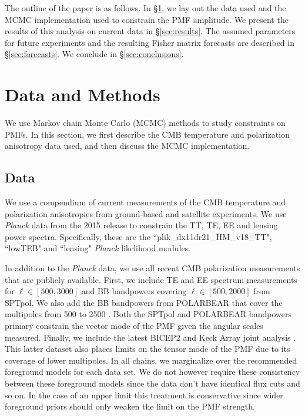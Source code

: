\documentclass[preprint]{emulateapj}
\newcommand{\planck}{{\sl Planck}}
\newcommand{\pb}{POLARBEAR}
\newcommand{\sptpol}{SPTpol}
\begin{document}
The outline of the paper is as follows. 
In \S\ref{sec:data}, we lay out the data used and the MCMC implementation used to constrain the PMF amplitude. 
We present the results of this analysis on current data in \S\ref{sec:results}. 
The assumed parameters for future experiments and the resulting Fisher matrix forecasts are described in \S\ref{sec:forecasts}. 
We conclude in \S\ref{sec:conclusions}. 

\section{Data and Methods}
\label{sec:data}

We use  Markov chain Monte Carlo (MCMC) methods to study constraints on PMFs. 
In this section, we first describe the CMB temperature and polarization anisotropy data used, and then discuss the MCMC implementation. 




\subsection{Data}

We use a compendium of current measurements of the CMB temperature and polarization anisotropies from ground-based and satellite experiments. 
We use \planck{} data from the 2015 release to constrain the TT, TE, EE and lensing power spectra. 
Specifically, these are the ``plik\_dx11dr21\_HM\_v18\_TT", ``lowTEB" and ``lensing" \planck{} likelihood modules. 


In addition to the \planck{} data, we use all recent CMB polarization measurements that are publicly available. 
First, we include TE and EE spectrum measurements\citep{crites15} for $\ell \in [500,3000]$ and BB bandpowers covering $\ell \in [500,2000]$ \citep{keisler15} from SPTpol. 
We also add the BB bandpowers from \pb{} that cover the multipoles from 500 to 2500 \citep{polarbear14b}. 
Both the \sptpol{} and \pb{} bandpowers primary constrain the vector mode of the PMF given the angular scales measured. 
Finally, we include the latest BICEP2 and Keck Array  joint analysis \citep{bicepkeck15}. 
This latter dataset also places limits on the tensor mode of the PMF due to its coverage of lower multipoles. 
In all chains, we marginalize over the recommended foreground models for each data set. 
We do not however require these consistency between these foreground models since the data don't have identical flux cuts and so on. 
In the case of an upper limit this treatment is conservative since wider foreground priors should only weaken the limit on the PMF strength. 
\end{document}
